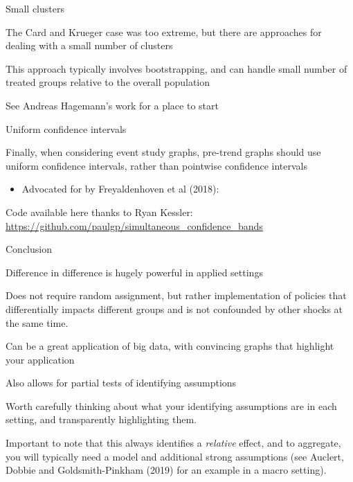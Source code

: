 \documentclass[notes,11pt, aspectratio=169]{beamer}
\newenvironment{wideitemize}{\itemize\addtolength{\itemsep}{10pt}}{\enditemize}
\begin{document}
\begin{frame}{Small clusters}
  \begin{wideitemize}
  \item The Card and Krueger case was too extreme, but there are approaches for dealing with a small number of clusters
  \item This approach typically involves  bootstrapping, and can handle small number of treated groups relative to the overall population
  \item See Andreas Hagemann's work for a place to start
  \end{wideitemize}
\end{frame}

\begin{frame}{Uniform confidence intervals}
  \begin{wideitemize}
  \item Finally, when considering event study graphs, pre-trend graphs
    should use uniform confidence intervals, rather than pointwise confidence intervals
    \begin{itemize}
    \item Advocated for by Freyaldenhoven et al (2018):
    \end{itemize}
  \item Code available here thanks to Ryan Kessler: \url{https://github.com/paulgp/simultaneous_confidence_bands}
    \begin{center}
    \end{center}
  \end{wideitemize}
\end{frame}


\begin{frame}{Conclusion}
  \begin{wideitemize}
  \item Difference in difference is hugely powerful in applied settings
  \item Does not require random assignment, but rather implementation
    of policies that differentially impacts different groups and is
    not confounded by other shocks at the same time.
  \item Can be a great application of big data, with convincing graphs
    that highlight your application
  \item Also allows for partial tests of identifying assumptions
  \item Worth carefully thinking about what your identifying
    assumptions are in each setting, and transparently highlighting
    them.
  \item Important to note that this always identifies a
    \emph{relative} effect, and to aggregate, you will typically need
    a model and additional strong assumptions (see Auclert, Dobbie and
    Goldsmith-Pinkham (2019) for an example in a macro setting).
  \end{wideitemize}
\end{frame}
\end{document}
